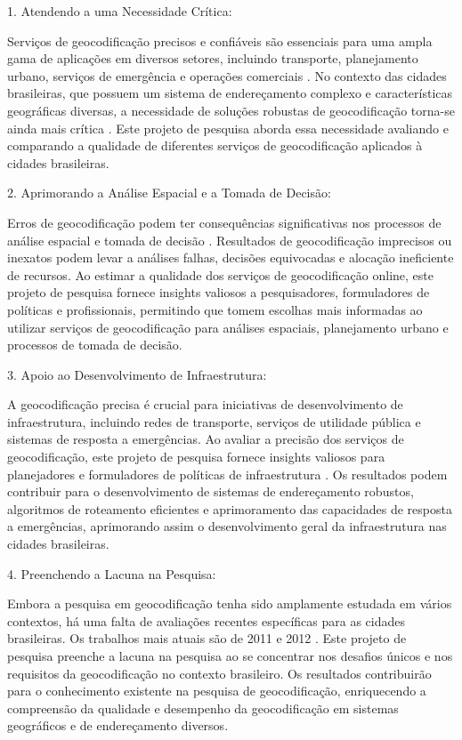 \documentclass{article}
\begin{document}
1. Atendendo a uma Necessidade Crítica:

Serviços de geocodificação precisos e confiáveis são essenciais para uma ampla gama de aplicações em diversos setores, incluindo transporte, planejamento urbano, serviços de emergência e operações comerciais \cite{kilic2020accuracy,cortes2021improving}. No contexto das cidades brasileiras, que possuem um sistema de endereçamento complexo e características geográficas diversas, a necessidade de soluções robustas de geocodificação torna-se ainda mais crítica  \cite{martins2012geocodificacao,davis2011evaluation}. Este projeto de pesquisa aborda essa necessidade avaliando e comparando a qualidade de diferentes serviços de geocodificação aplicados à cidades brasileiras.

2. Aprimorando a Análise Espacial e a Tomada de Decisão:

Erros de geocodificação podem ter consequências significativas nos processos de análise espacial e tomada de decisão \cite{cortes2021improving}. Resultados de geocodificação imprecisos ou inexatos podem levar a análises falhas, decisões equivocadas e alocação ineficiente de recursos. Ao estimar a qualidade dos serviços de geocodificação online, este projeto de pesquisa fornece insights valiosos a pesquisadores, formuladores de políticas e profissionais, permitindo que tomem escolhas mais informadas ao utilizar serviços de geocodificação para análises espaciais, planejamento urbano e processos de tomada de decisão.

3. Apoio ao Desenvolvimento de Infraestrutura:

A geocodificação precisa é crucial para iniciativas de desenvolvimento de infraestrutura, incluindo redes de transporte, serviços de utilidade pública e sistemas de resposta a emergências. Ao avaliar a precisão dos serviços de geocodificação, este projeto de pesquisa fornece insights valiosos para planejadores e formuladores de políticas de infraestrutura \cite{de2013deployment}. Os resultados podem contribuir para o desenvolvimento de sistemas de endereçamento robustos, algoritmos de roteamento eficientes e aprimoramento das capacidades de resposta a emergências, aprimorando assim o desenvolvimento geral da infraestrutura nas cidades brasileiras.

4. Preenchendo a Lacuna na Pesquisa:

Embora a pesquisa em geocodificação tenha sido amplamente estudada em vários contextos, há uma falta de avaliações recentes específicas para as cidades brasileiras. Os trabalhos mais atuais são de 2011 e 2012 \cite{davis2011evaluation,martins2012geocodificacao}. Este projeto de pesquisa preenche a lacuna na pesquisa ao se concentrar nos desafios únicos e nos requisitos da geocodificação no contexto brasileiro. Os resultados contribuirão para o conhecimento existente na pesquisa de geocodificação, enriquecendo a compreensão da qualidade e desempenho da geocodificação em sistemas geográficos e de endereçamento diversos.
   
\end{document}
